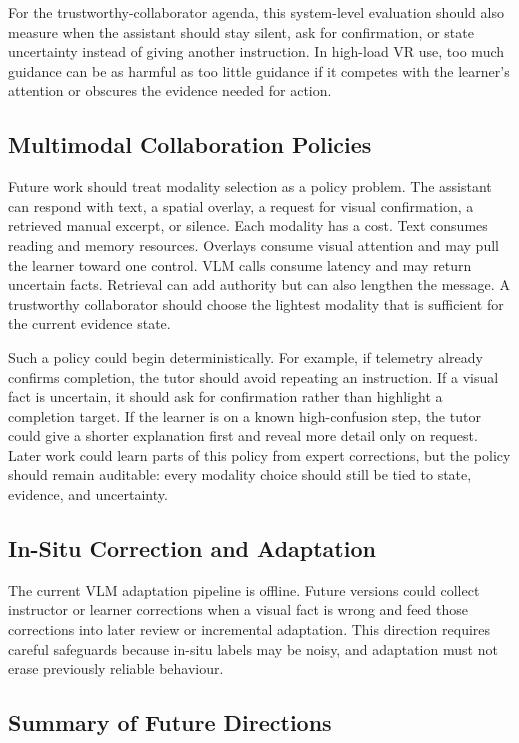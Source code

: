 For the trustworthy-collaborator agenda, this system-level evaluation should
also measure when the assistant should stay silent, ask for confirmation, or
state uncertainty instead of giving another instruction. In high-load VR use,
too much guidance can be as harmful as too little guidance if it competes with
the learner's attention or obscures the evidence needed for action.

\subsection{Multimodal Collaboration Policies}

Future work should treat modality selection as a policy problem. The assistant
can respond with text, a spatial overlay, a request for visual confirmation, a
retrieved manual excerpt, or silence. Each modality has a cost. Text consumes
reading and memory resources. Overlays consume visual attention and may pull
the learner toward one control. VLM calls consume latency and may return
uncertain facts. Retrieval can add authority but can also lengthen the message.
A trustworthy collaborator should choose the lightest modality that is
sufficient for the current evidence state.

Such a policy could begin deterministically. For example, if telemetry already
confirms completion, the tutor should avoid repeating an instruction. If a
visual fact is uncertain, it should ask for confirmation rather than highlight a
completion target. If the learner is on a known high-confusion step, the tutor
could give a shorter explanation first and reveal more detail only on request.
Later work could learn parts of this policy from expert corrections, but the
policy should remain auditable: every modality choice should still be tied to
state, evidence, and uncertainty.

\subsection{In-Situ Correction and Adaptation}

The current VLM adaptation pipeline is offline. Future versions could collect
instructor or learner corrections when a visual fact is wrong and feed those
corrections into later review or incremental adaptation. This direction requires
careful safeguards because in-situ labels may be noisy, and adaptation must not
erase previously reliable behaviour.

\subsection{Summary of Future Directions}

